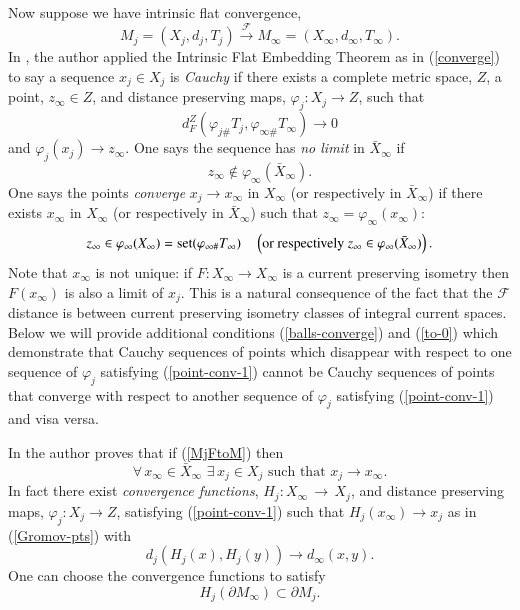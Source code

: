 \documentclass[12pt]{amsart}
\begin{document}
Now suppose we have intrinsic flat convergence,
\begin{equation}\label{MjFtoM}
M_j = (X_j, d_j, T_j) {\stackrel {\mathcal{F}}{\longrightarrow} } M_\infty=(X_\infty, d_\infty, T_\infty).
\end{equation}
In \cite{Sormani-AA}, the author applied the Intrinsic Flat Embedding Theorem
as in (\ref{converge}) to say a sequence $x_j \in X_j$ is {\em Cauchy}
if there exists
a complete metric space, $Z$, a point, $z_\infty \in Z$, and distance preserving maps, $\varphi_j: X_j \to Z$, such that
\begin{equation} \label{point-conv-1}
d_F^Z\left(\varphi_{j\#} T_j ,\varphi_{\infty\#}T_\infty\right)\to 0
\end{equation}
and $\varphi_j(x_j) \to z_\infty$.
One says the
sequence has {\em no limit} in $\bar{X}_\infty$ if 
\begin{equation}\label{no limit}
z_\infty \notin \varphi_\infty(\bar{X}_\infty).
\end{equation}
One says the points {\em converge} $x_j \to x_\infty$ in $X_\infty$ (or respectively
in $\bar{X}_\infty$) 
if there exists $x_\infty$ in $X_\infty$ (or respectively
in $\bar{X}_\infty$)
such that $z_\infty=\varphi_\infty(x_\infty)$:
\begin{equation}\label{not-disappearing}
z_\infty \in \varphi_\infty(X_\infty)= {{\rm{set}}}( \varphi_{\infty\#}T_\infty)
\quad \left( \textrm{or respectively }
z_\infty \in \varphi_\infty(\bar{X}_\infty) \right).
\end{equation}
Note that $x_\infty$ is not unique: if $F: X_\infty\to X_\infty$ is a current preserving
isometry then $F(x_\infty)$ is also a limit of $x_j$.  This is a natural consequence
of the fact that the $\mathcal{F}$ distance is between current preserving
isometry classes of integral current spaces. Below we will provide additional
conditions (\ref{balls-converge}) and (\ref{to-0}) which demonstrate that
Cauchy
sequences of points which disappear with respect to one 
sequence of $\varphi_j$ satisfying (\ref{point-conv-1})
cannot be Cauchy sequences of
points that converge with respect to another sequence
of $\varphi_j$ satisfying (\ref{point-conv-1})
and visa versa.

In \cite{Sormani-AA} the author proves that if (\ref{MjFtoM}) then
\begin{equation}\label{to-a-point}
\forall \, x_\infty\in \bar{X}_\infty \,\,\exists \,
x_j \in X_j \textrm{ such that } x_j \to x_\infty.
\end{equation}
In fact there exist {\em convergence functions}, $H_j: X_\infty \,\to\, X_j$, and distance preserving maps, $\varphi_j: X_j \to Z$, satisfying (\ref{point-conv-1})
such that $H_j(x_\infty) \to x_j$ as in (\ref{Gromov-pts})
with
\begin{equation} \label{dist-cont-2}
d_j(H_j(x), H_j(y)) \to d_\infty(x,y).
\end{equation}
One can choose the convergence functions to satisfy
\begin{equation} \label{Hj}
H_j(\partial M_\infty) \subset \partial M_j.
\end{equation}
\end{document}
